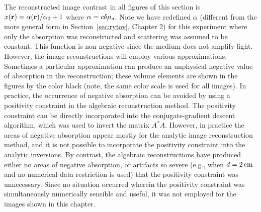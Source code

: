 The reconstructed image contrast in all figures of this section is $x(\mathbf{r}) = \alpha(\mathbf{r}) / \alpha_0+1$ where $\alpha = c\delta\mu_a$. Note we have redefined $\alpha$ (different from the more general form in Section~\ref{sec:rytov}, Chapter 2) for this experiment where only the absorption was reconstructed and scattering was assumed to be constant. This function is non-negative since the medium does not amplify light. However, the image reconstructions will employ various approximations. Sometimes a particular approximation can produce an unphysical negative value of absorption in the reconstruction; these volume elements are shown in the figures by the color black (note, the same color scale is used for all images). In practice, the occurrence of negative absorption can be avoided by using a positivity constraint in the algebraic reconstruction method. The positivity constraint can be directly incorporated into the conjugate-gradient descent algorithm, which was used to invert the matrix $A^*A$. However, in practice the areas of negative absorption appear mostly for the analytic image reconstruction method, and it is not possible to incorporate the positivity constraint into the analytic inversions. By contrast, the algebraic reconstructions have produced either no areas of negative absorption, or artifacts so severe (e.g., when $d=2\,{\rm cm}$ and no numerical data restriction is used) that the positivity constraint was unnecessary. Since no situation occurred wherein the positivity constraint was simultaneously numerically sensible and useful, it was not employed for the images shown in this chapter.


